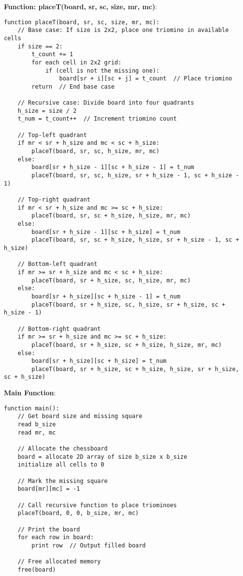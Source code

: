 \documentclass[a4paper,12pt]{report}
\begin{document}
\newpage
\textbf{Function: placeT(board, sr, sc, size, mr, mc)}:
\begin{tcolorbox}[colback=white, colframe=black, boxrule=0.5pt]
\ttfamily\small
\begin{verbatim}
function placeT(board, sr, sc, size, mr, mc):
    // Base case: If size is 2x2, place one triomino in available cells
    if size == 2:
        t_count += 1
        for each cell in 2x2 grid:
            if (cell is not the missing one):
                board[sr + i][sc + j] = t_count  // Place triomino
        return  // End base case

    // Recursive case: Divide board into four quadrants
    h_size = size / 2
    t_num = t_count++  // Increment triomino count

    // Top-left quadrant
    if mr < sr + h_size and mc < sc + h_size:
        placeT(board, sr, sc, h_size, mr, mc)
    else:
        board[sr + h_size - 1][sc + h_size - 1] = t_num
        placeT(board, sr, sc, h_size, sr + h_size - 1, sc + h_size - 1)

    // Top-right quadrant
    if mr < sr + h_size and mc >= sc + h_size:
        placeT(board, sr, sc + h_size, h_size, mr, mc)
    else:
        board[sr + h_size - 1][sc + h_size] = t_num
        placeT(board, sr, sc + h_size, h_size, sr + h_size - 1, sc + h_size)

    // Bottom-left quadrant
    if mr >= sr + h_size and mc < sc + h_size:
        placeT(board, sr + h_size, sc, h_size, mr, mc)
    else:
        board[sr + h_size][sc + h_size - 1] = t_num
        placeT(board, sr + h_size, sc, h_size, sr + h_size, sc + h_size - 1)

    // Bottom-right quadrant
    if mr >= sr + h_size and mc >= sc + h_size:
        placeT(board, sr + h_size, sc + h_size, h_size, mr, mc)
    else:
        board[sr + h_size][sc + h_size] = t_num
        placeT(board, sr + h_size, sc + h_size, h_size, sr + h_size, sc + h_size)
\end{verbatim}
\end{tcolorbox}
\newpage
\textbf{Main Function}:
\begin{tcolorbox}[colback=white, colframe=black, boxrule=0.5pt]
\ttfamily\small
\begin{verbatim}
function main():
    // Get board size and missing square
    read b_size
    read mr, mc

    // Allocate the chessboard
    board = allocate 2D array of size b_size x b_size
    initialize all cells to 0

    // Mark the missing square
    board[mr][mc] = -1

    // Call recursive function to place triominoes
    placeT(board, 0, 0, b_size, mr, mc)

    // Print the board
    for each row in board:
        print row  // Output filled board

    // Free allocated memory
    free(board)
\end{verbatim}
\end{tcolorbox}
\end{document}
